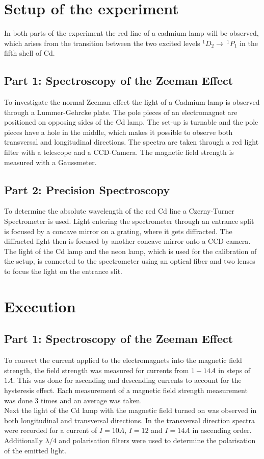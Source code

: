 \documentclass[12pt]{article}
\begin{document}
\section{Setup of the experiment}
In both parts of the experiment the red line of a cadmium lamp will be observed, which arises from the transition between the two excited levels $^1D_2\rightarrow \ ^1P_1$ in the fifth shell of Cd.
\subsection{Part 1: Spectroscopy of the Zeeman Effect}
To investigate the normal Zeeman effect the light of a Cadmium lamp is observed through a Lummer-Gehrcke plate. The pole pieces of an electromagnet are positioned on opposing sides of the Cd lamp. The set-up is turnable and the pole pieces have a hole in the middle, which makes it possible to observe both transversal and longitudinal directions. The spectra are taken through a red light filter with a telescope and a CCD-Camera. The magnetic field strength is measured with a Gaussmeter.
\subsection{Part 2: Precision Spectroscopy}
To determine the absolute wavelength of the red Cd line a Czerny-Turner Spectrometer is used. Light entering the spectrometer through an entrance split is focused by a concave mirror on a grating, where it gets diffracted. The diffracted light then is focused by another concave mirror onto a CCD camera. The light of the Cd lamp and the neon lamp, which is used for the calibration of the setup, is connected to the spectrometer using an optical fiber and two lenses to focus the light on the entrance slit. 

\section{Execution}
\subsection{Part 1: Spectroscopy of the Zeeman Effect}
To convert the current applied to the electromagnets into the magnetic field strength, the field strength was measured for currents from $1-14A$ in steps of $1A$. This was done for ascending and descending currents to account for the hysteresis effect. Each measurement of a magnetic field strength measurement was done 3 times and an average was taken.
\\Next the light of the Cd lamp with the magnetic field turned on was observed in both longitudinal and transversal directions. In the transversal direction spectra were recorded for a current of $I=10A$, $I=12$ and $I=14A$ in ascending order. Additionally $\lambda/4$ and polarisation filters were used to determine the polarisation of the emitted light. 
\end{document}
